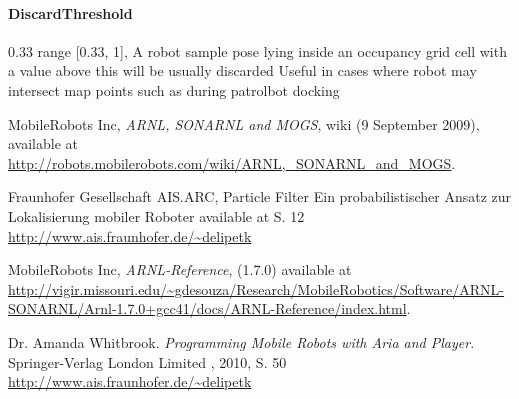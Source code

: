 \documentclass{article}
\begin{document}
\paragraph{DiscardThreshold} 0.33     range [0.33, 1],  A robot sample pose lying inside
                          an occupancy grid cell with a value above this will
                          be usually discarded Useful in cases where robot may
                          intersect map points such as during patrolbot
                          docking





\begin{thebibliography}{------}
	 MobileRobots Inc, \emph{ARNL, SONARNL and MOGS},  wiki (9 September 2009), available at 
		\url{http://robots.mobilerobots.com/wiki/ARNL,_SONARNL_and_MOGS}.
	
	
	
	 Fraunhofer Gesellschaft AIS.ARC, Particle Filter
			Ein probabilistischer Ansatz zur Lokalisierung mobiler Roboter available at S. 12
			\url{http://www.ais.fraunhofer.de/~delipetk}
	
	
	
	
	
	 MobileRobots Inc, \emph{ARNL-Reference}, (1.7.0) available at 				
	\url{http://vigir.missouri.edu/~gdesouza/Research/MobileRobotics/Software/ARNL-SONARNL/Arnl-1.7.0+gcc41/docs/ARNL-Reference/index.html}.
	
	
	
	
		Dr. Amanda Whitbrook.
		{\em Programming Mobile Robots with Aria and Player}.
		Springer-Verlag London Limited , 2010, S. 50
		\url{http://www.ais.fraunhofer.de/~delipetk}

\end{thebibliography}
\listoffigures
\end{document}
